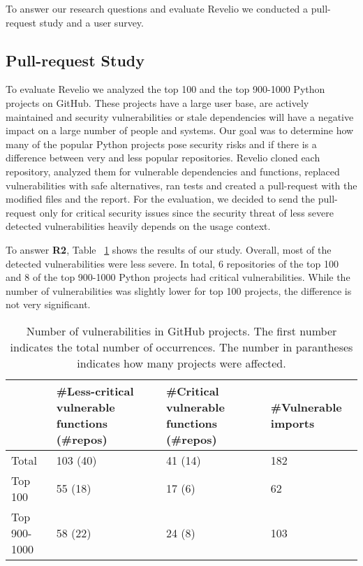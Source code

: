 To answer our research questions and evaluate Revelio we conducted a pull-request study and a user survey.

\subsection{Pull-request Study}

To evaluate Revelio we analyzed the top 100 and the top 900-1000 Python projects on GitHub. These projects have a large user base, are actively maintained and security vulnerabilities or stale dependencies will have a negative impact on a large number of people and systems. Our goal was to determine how many of the popular Python projects pose security risks and if there is a difference between very and less popular repositories. Revelio cloned each repository, analyzed them for vulnerable dependencies and functions, replaced vulnerabilities with safe alternatives, ran tests and created a pull-request with the modified files and the report. For the evaluation, we decided to send the pull-request only for critical security issues since the security threat of less severe detected vulnerabilities heavily depends on the usage context.

To answer \textbf{R2}, Table ~\ref{tab:vuln} shows the results of our study. Overall, most of the detected vulnerabilities were less severe. In total, 6 repositories of the top 100 and 8 of the top 900-1000 Python projects had critical vulnerabilities. While the number of vulnerabilities was slightly lower for top 100 projects, the difference is not very significant.

\begin{table}[!h]
\small
  \centering
  \begin{tabular}{|p{}|p{}|p{}|p{}|}
    \hline
 & \#Less-critical vulnerable functions (\#repos)& \#Critical vulnerable functions (\#repos) & \#Vulnerable imports \\
\hline
\hline
Total & 103 (40) & 41 (14) & 182  \\
\hline
Top 100 & 55 (18) & 17 (6) & 62 \\
\hline
Top 900-1000 & 58 (22) & 24 (8) & 103  \\
 \hline
  \end{tabular}
  \caption{Number of vulnerabilities in GitHub projects. The first number indicates the total number of occurrences. The number in parantheses indicates how many projects were affected.} \label{tab:vuln}
\end{table}


